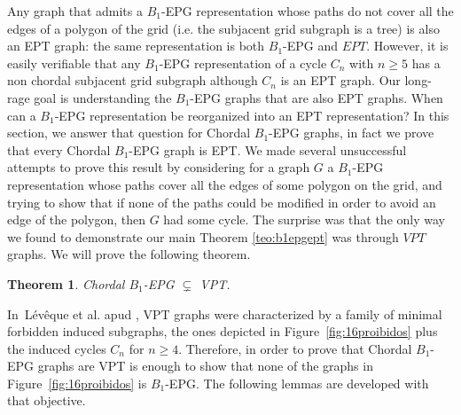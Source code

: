 \documentclass[9pt]{entcs}
\newtheorem{teo}{Theorem}[section]
\begin{document}
 Any graph that
admits a $B_1$-EPG representation  whose paths do not cover all the edges of a polygon of the grid (i.e.
the subjacent grid subgraph is a tree)  is also an EPT graph: the same representation is both $B_1$-EPG and $EPT$.
However, it is easily verifiable that any $B_1$-EPG representation of a cycle $C_n$ with $n\geq 5$
has a non chordal subjacent grid subgraph although $C_n$ is an  EPT graph.  Our long-rage goal is 
understanding the $B_1$-EPG graphs that are also EPT graphs. When can a $B_1$-EPG representation
be reorganized into an EPT representation?  In this section,
 we answer that question for Chordal $B_1$-EPG graphs, in fact we prove that every Chordal $B_1$-EPG graph is EPT. We
 made several unsuccessful attempts to prove this result by considering for a graph $G$ a $B_1$-EPG representation whose paths cover all the edges
 of some polygon on the grid, and trying  to show  that if none of the paths could be modified in order to avoid an edge of the polygon,
 then $G$ had some  cycle. The surprise was that the only way we found to demonstrate our main Theorem \ref{teo:b1epgept} was through $VPT$ graphs.
 We will prove the following theorem.

\begin{teo}\label{teo:chordalB1inVPT}
Chordal $B_1$-EPG $\subsetneq$ VPT. 
\end{teo}

In~L{\'e}v{\^e}que et al. \cite{leveque2009characterizing} apud \cite{alcon2015characterizing},  VPT graphs were characterized by a family of minimal forbidden induced subgraphs,
the ones depicted in 
Figure~\ref{fig:16proibidos} plus the induced cycles $C_n$ for $n\geq 4$. Therefore, in order to prove
that Chordal $B_1$-EPG graphs are VPT is enough to show that none of the graphs in Figure~\ref{fig:16proibidos} 
is $B_1$-EPG. The following lemmas are developed with that objective.   



 

\end{document}
